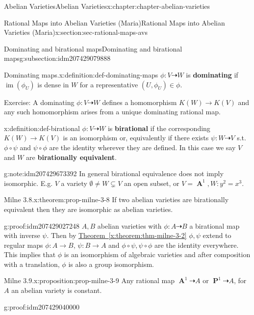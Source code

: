 \documentclass[oneside,10pt,]{book}
\newcommand{\terminology}[1]{\textbf{#1}}
\numberwithin{equation}{section}
\DeclareMathOperator{\im}{im}
\DeclareMathOperator{\aff}{\mathbf{A}}
\DeclareMathOperator{\PP}{\mathbf{P}}
\begin{document}
\begin{chapterptx}{Abelian Varieties}{}{Abelian Varieties}{}{}{x:chapter:chapter-abelian-varieties}
\begin{sectionptx}{Rational Maps into Abelian Varieties (Maria)}{}{Rational Maps into Abelian Varieties (Maria)}{}{}{x:section:sec-rational-maps-avs}
\begin{subsectionptx}{Dominating and birational maps}{}{Dominating and birational maps}{}{}{g:subsection:idm207429079888}
\begin{definition}{Dominating maps.}{x:definition:def-dominating-maps}%
\(\phi\colon V \dashrightarrow W\) is \terminology{dominating} if \(\im (\phi_U)\) is dense in \(W\) for a representative \((U,\phi_U)\in \phi\).%
\end{definition}
Exercise: A dominating \(\phi\colon V\dashrightarrow W\) defines a homomorphism \(K(W) \to K(V)\) and any such homomorphism arises from a unique dominating rational map.%
\begin{definition}{}{x:definition:def-birational}%
\(\phi\colon V \dashrightarrow W\) is \terminology{birational} if the corresponding \(K(W)\to K(V)\) is an isomorphism or, equivalently if there exists \(\psi\colon W\dashrightarrow V \) s.t. \(\phi\circ \psi\) and \(\psi\circ\phi\) are the identity wherever they are defined. In this case we say \(V\) and \(W\) are \terminology{birationally equivalent}.%
\end{definition}
\begin{note}{}{g:note:idm207429673392}%
In general birational equivalence does not imply isomorphic. E.g. \(V\) a variety \(\emptyset \ne W\subsetneq V\) an open subset, or \(V= \aff^1, W \colon y^2 =x^3\).%
\end{note}
\begin{theorem}{Milne 3.8.}{}{x:theorem:prop-milne-3-8}%
If two abelian varieties are birationally equivalent then they are isomorphic as abelian varieties.%
\end{theorem}
\begin{proofptx}{}{g:proof:idm207429027248}
\(A,B\) abelian varieties with \(\phi \colon A\dashrightarrow B\) a birational map with inverse \(\psi\). Then by \hyperref[x:theorem:thm-milne-3-2]{Theorem~\ref{x:theorem:thm-milne-3-2}} \(\phi ,\psi\) extend to regular maps   \(\phi\colon A \to B \), \(\psi\colon B\to A\) and \(\phi\circ\psi,\psi\circ\phi\) are  the identity everywhere. This implies that \(\phi\) is an isomorphism of  algebraic varieties and after composition with a translation, \(\phi\) is also a group isomorphism.%
\end{proofptx}
\begin{proposition}{Milne 3.9.}{}{x:proposition:prop-milne-3-9}%
Any rational map \(\aff^1 \dashrightarrow A\) or \(\PP^1 \dashrightarrow A\), for \(A\) an abelian variety is constant.%
\end{proposition}
\begin{proofptx}{}{g:proof:idm207429040000}

\end{proofptx}
\end{subsectionptx}
\end{sectionptx}
\end{chapterptx}
\end{document}
